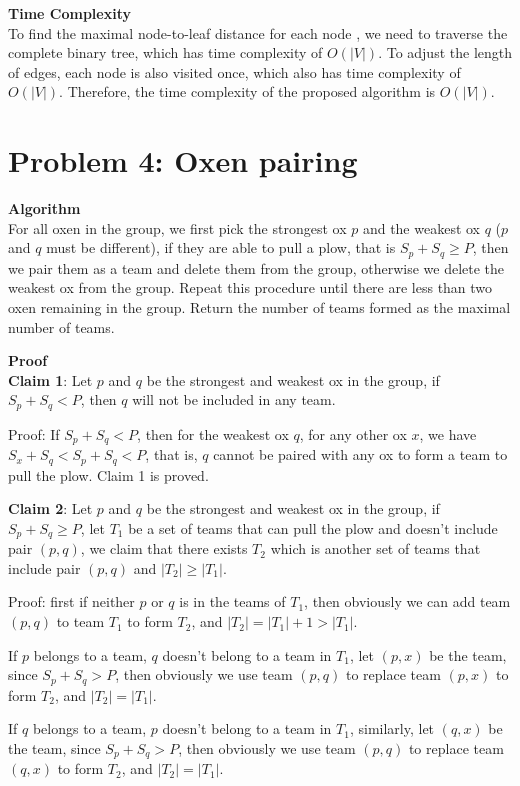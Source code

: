 \documentclass{article}
\newcommand{\Complexity}{\vspace{0.3cm} \noindent\textbf{Time Complexity} \\}
\newcommand{\Proof}{\vspace{0.3cm} \noindent\textbf{Proof} \\}
\newcommand{\Algorithm}{\textbf{Algorithm} \\}
\begin{document}
\Complexity
To find the maximal node-to-leaf distance for each node , we need to traverse the complete binary tree, 
which has time complexity of $O(|V|)$. To adjust the length of edges, each node is also visited
once,  which also has time complexity of $O(|V|)$. Therefore, the time complexity of the proposed
algorithm is $O(|V|)$.

\section*{Problem 4: Oxen pairing}
\Algorithm
For all oxen in the group, we first pick the strongest ox $p$ and the weakest ox $q$ ($p$ and $q$
must be different), if they 
are able to pull a plow, that is $S_p + S_q \geq P$, then we pair them as a team and delete them
from the group, otherwise we delete the weakest ox from the group. Repeat this procedure until there 
are less than two oxen remaining in the group. Return the number of teams formed as the maximal
number of teams.

\Proof
\textbf{Claim 1}: 
Let $p$ and $q$ be the strongest and weakest ox in the group, if $S_p + S_q < P$,
then $q$ will not be included in any team.

Proof: If $S_p + S_q < P$, then for the weakest ox $q$, for any other ox $x$, we have $S_x + S_q <
S_p + S_q < P$, that is, $q$ cannot be paired with any ox to form a team to pull the plow. Claim 1
is proved.

\vspace{0.3cm}
\textbf{Claim 2}: 
Let $p$ and $q$ be the strongest and weakest ox in the group, if $S_p + S_q \geq P$, let $T_1$ be a
set of teams that can pull the plow and doesn't include pair $(p, q)$, we claim that there exists
$T_2$ which is another set of teams that include pair $(p, q)$ and $|T_2| \geq |T_1|$.

Proof: first if neither $p$ or $q$ is in the teams of $T_1$, then obviously we can add team $(p,
q)$ to team $T_1$ to form $T_2$, and $|T_2| = |T_1| + 1 > |T_1|$.

If $p$ belongs to a team, $q$ doesn't belong to a team in $T_1$, let $(p, x)$ be the team, since 
$S_p + S_q > P$, then obviously we use team $(p, q)$ to replace team $(p, x)$ to form $T_2$, and 
$|T_2| = |T_1|$.


If $q$ belongs to a team, $p$ doesn't belong to a team in $T_1$, similarly, let $(q, x)$ be the team, since 
$S_p + S_q > P$, then obviously we use team $(p, q)$ to replace team $(q, x)$ to form $T_2$, and 
$|T_2| = |T_1|$.
\end{document}
